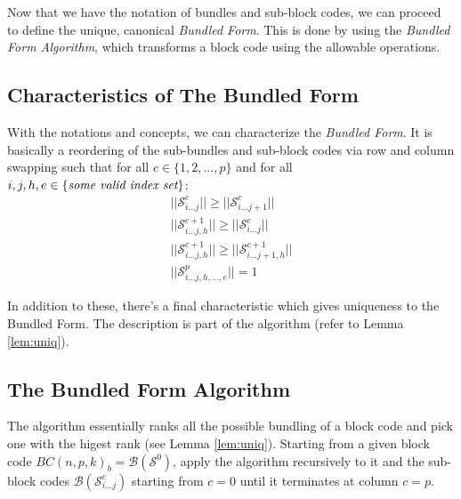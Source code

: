 \documentclass[12pt]{article}  %
\begin{document}
Now that we have the notation of bundles and sub-block codes, we can proceed to define the unique, canonical \textit{Bundled Form}. This is done by using the \textit{Bundled Form Algorithm}, which transforms a block code using the allowable operations.














\subsection{Characteristics of The Bundled Form}

With the notations and concepts, we can characterize the \emph{Bundled Form}. It is basically a reordering of the sub-bundles and sub-block codes via row and column swapping such that for all $c \in \{1,2,\dots,p\}$ and for all $ i,j,h,e \in \{\emph{some valid index set}\}$:
\begin{align}
||\mathcal{S}^{c}_{i \dots j}|| \geq
||\mathcal{S}^{c}_{i \dots j+1}||\\
||\mathcal{S}^{c+1}_{i \dots j,h}|| \geq
||\mathcal{S}^{c}_{i \dots j}||\\
||\mathcal{S}^{c+1}_{i \dots j,h}|| \geq
||\mathcal{S}^{c+1}_{i \dots j+1,h}||\\
||\mathcal{S}^{p}_{i \dots j,h,\dots,e}||=1
\end{align}

In addition to these, there's a final characteristic which gives uniqueness to the Bundled Form. The description is part of the algorithm (refer to Lemma \ref{lem:uniq}).











\subsection{The Bundled Form Algorithm}

The algorithm essentially ranks all the possible bundling of a block code and pick one with the higest rank (see Lemma \ref{lem:uniq}). Starting from a given block code $BC(n,p,k)_b=\mathcal{B}(\mathcal{S}^0)$, apply the algorithm recursively to it and the sub-block codes $\mathcal{B}(\mathcal{S}^c_{i\dots j})$ starting from $c=0$ until it terminates at column $c=p$.
\end{document}
